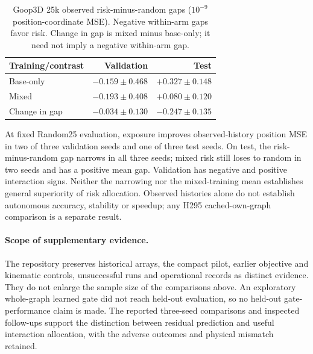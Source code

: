 \begin{table}[!ht]
\centering\small
\setlength{\tabcolsep}{5pt}\renewcommand{\arraystretch}{1.12}
\caption{Goop3D 25k observed risk-minus-random gaps ($10^{-9}$ position-coordinate MSE). Negative within-arm gaps favor risk. Change in gap is mixed minus base-only; it need not imply a negative within-arm gap.}
\label{tab:goop3d25k-observed-position-contrasts}
\begin{tabular}{lrr}
\toprule
Training/contrast & Validation & Test\\
\midrule
Base-only & $-0.159\pm0.468$ & $+0.327\pm0.148$\\
Mixed & $-0.193\pm0.408$ & $+0.080\pm0.120$\\
Change in gap & $-0.034\pm0.130$ & $-0.247\pm0.135$\\
\bottomrule
\end{tabular}
\end{table}


At fixed Random25 evaluation, exposure improves observed-history position MSE in two of three validation seeds and one of three test seeds. On test, the risk-minus-random gap narrows in all three seeds; mixed risk still loses to random in two seeds and has a positive mean gap. Validation has negative and positive interaction signs. Neither the narrowing nor the mixed-training mean establishes general superiority of risk allocation. Observed histories alone do not establish autonomous accuracy, stability or speedup; any H295 cached-own-graph comparison is a separate result.


\paragraph{Scope of supplementary evidence.}
The repository preserves historical arrays, the compact pilot, earlier objective and kinematic controls, unsuccessful runs and operational records as distinct evidence. They do not enlarge the sample size of the comparisons above. An exploratory whole-graph learned gate did not reach held-out evaluation, so no held-out gate-performance claim is made. The reported three-seed comparisons and inspected follow-ups support the distinction between residual prediction and useful interaction allocation, with the adverse outcomes and physical mismatch retained.
